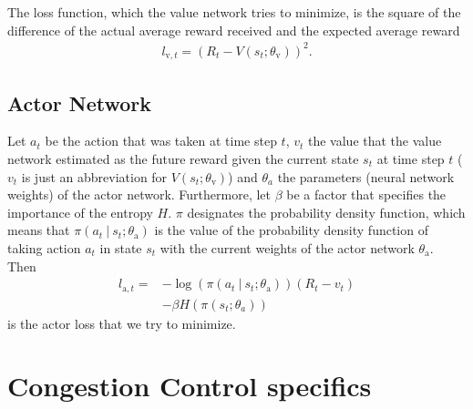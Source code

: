 \documentclass[sigconf]{acmart}
\newcommand\givenbase[1][]{\:#1\lvert\:}
\let\given\givenbase
\begin{document}
The loss function, which the value network tries to minimize, is the square of the difference of the actual average reward received and the expected average reward
\begin{align*}
l_{\text{v},t} = \left(R_t - V(s_t; \theta_\text{v})\right)^2.
\end{align*}

\subsection{Actor Network}
\label{subsec:genericactor}

Let $a_t$ be the action that was taken at time step $t$, $v_t$ the value that the value network estimated as the future reward given the current state $s_t$ at time step $t$ ($v_t$ is just an abbreviation for $V(s_t; \theta_\text{v})$) and $\theta_a$ the parameters (neural network weights) of the actor network. Furthermore, let $\beta$ be a factor that specifies the importance of the entropy $H$. $\pi$ designates the probability density function, which means that $\pi\left( a_t \given s_t; \theta_\text{a} \right)$ is the value of the probability density function of taking action $a_t$ in state $s_t$ with the current weights of the actor network $\theta_\text{a}$. Then
\begin{align*}
l_{\text{a},t} =& -\log \left( \pi\left( a_t \given s_t; \theta_\text{a} \right)\right)\left( R_t - v_t \right)\\ 
&- \beta H\left( \pi\left( s_t; \theta_a \right)\right)
\end{align*}
is the actor loss that we try to minimize. 

\section{Congestion Control specifics}
\end{document}
